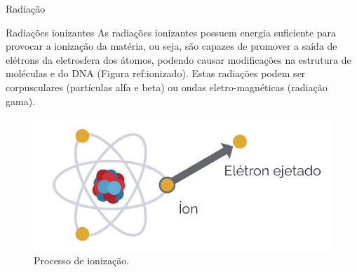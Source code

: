 \documentclass[presentation]{beamer}
\begin{document}
\begin{frame}[label={sec:org923748c}]{Radiação}
\begin{block}{Radiações ionizantes}
As radiações ionizantes possuem energia suficiente para provocar a ionização da matéria, ou seja, são capazes de promover a saída de elétrons da eletrosfera dos átomos, podendo causar modificações na estrutura de moléculas e do DNA (Figura ref:ionizado). Estas radiações podem ser corpusculares (partículas alfa e beta) ou ondas eletro-magnéticas (radiação gama).

\begin{figure}[htbp]
\centering
\includegraphics[scale=0.3]{./ionizado.png}
\caption{\label{fig:orge78f973}Processo de ionização.}
\end{figure}
\end{block}
\end{frame}
\end{document}
